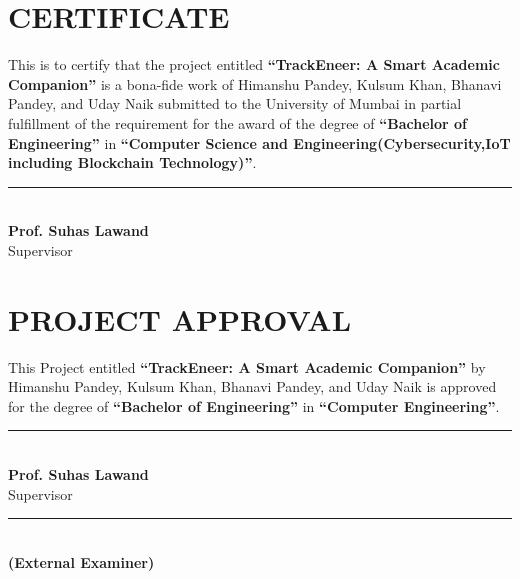 \documentclass[12pt]{article}
\begin{document}
\newpage
\section*{CERTIFICATE}
\vspace{1.5cm}
\noindent
This is to certify that the project entitled \textbf{``TrackEneer: A Smart Academic Companion''} is a bona-fide work of Himanshu Pandey, Kulsum Khan, Bhanavi Pandey, and Uday Naik submitted to the University of Mumbai in partial fulfillment of the requirement for the award of the degree of \textbf{``Bachelor of Engineering''} in \textbf{``Computer Science and Engineering(Cybersecurity,IoT including Blockchain Technology)''}.

\vspace{4cm}

    \parbox{6cm}{
        \centering
        \rule{6cm}{0.4pt} \\
        \vspace{0.2cm}
        \textbf{Prof. Suhas Lawand} \\
        Supervisor
    }

\thispagestyle{empty}

\newpage
\section*{PROJECT APPROVAL}
\vspace{1.5cm}
\noindent
This Project entitled \textbf{``TrackEneer: A Smart Academic Companion''} by Himanshu Pandey, Kulsum Khan, Bhanavi Pandey, and Uday Naik is approved for the degree of \textbf{``Bachelor of Engineering''} in \textbf{``Computer Engineering''}.

\vspace{5cm}
\noindent\begin{parbox}[t]{\textwidth}{
    \raggedleft
    \parbox{6cm}{
        \centering
        \rule{6cm}{0.4pt} \\
        \vspace{0.2cm}
        \textbf{Prof. Suhas Lawand} \\
        Supervisor
    }
}\end{parbox}

\vspace{3cm}
\noindent\begin{parbox}[t]{\textwidth}{
    \raggedleft
    \parbox{6cm}{
        \centering
        \rule{6cm}{0.4pt} \\
        \vspace{0.2cm}
        \textbf{(External Examiner)}
    }
}\end{parbox}
\end{document}
